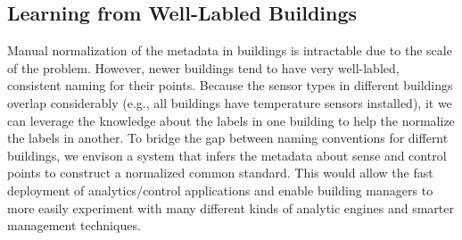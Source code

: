 \subsection{Learning from Well-Labled Buildings}
Manual normalization of the metadata in buildings is intractable due to 
the scale of the problem. However, newer buildings tend to have very well-labled, consistent
naming for their points.
Because the sensor types in different buildings 
overlap considerably (e.g., all buildings have temperature sensors installed), it 
we can leverage the knowledge about the labels in one building to 
help the normalize the labels in another.
To bridge the gap between naming conventions for differnt buildings, we envison 
a system that infers the metadata about sense and control points to construct a normalized 
common standard.
This would allow the fast deployment of analytics/control applications and enable
building managers to more easily experiment with many different kinds 
of analytic engines and smarter management techniques. 

